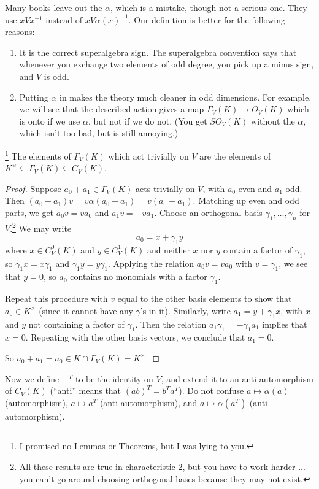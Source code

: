    Many books leave out the $\alpha$, which is a mistake, though not a serious one.
   They use $xVx^{-1}$ instead of $xV\alpha(x)^{-1}$.
   Our definition is better for the following reasons:
   \begin{enumerate}
   \item It is the correct superalgebra sign. The superalgebra convention
   says that whenever you exchange two elements of odd degree, you pick up a minus sign, and
   $V$ is odd.

   \item Putting $\alpha$ in makes the theory much cleaner in odd dimensions. For
   example, we will see that the described action gives a map $\Gamma_V(K)\to O_V(K)$
   which is onto if we use $\alpha$, but not if we do not. (You get $SO_V(K)$ without the
   $\alpha$, which isn't too bad, but is still annoying.)
   \end{enumerate}
 \begin{lemma}\label{lec23L} \hspace*{-1ex}\footnote{I promised no Lemmas or Theorems, but I was
   lying to you.} The elements of $\Gamma_V(K)$ which act trivially on
   $V$ are the elements of $K^\times \subseteq \Gamma_V(K)\subseteq C_V(K)$.
 \end{lemma}
 \begin{proof}
   Suppose $a_0+a_1\in \Gamma_V(K)$ acts trivially on $V$, with $a_0$ even and $a_1$ odd.
   Then $(a_0+a_1)v=v\alpha(a_0+a_1)=v(a_0-a_1)$. Matching up even and odd parts, we get
   $a_0v=va_0$ and $a_1 v=-va_1$. Choose an orthogonal basis $\gamma_1,\dots, \gamma_n$
   for $V$.\footnote{All these results are true in characteristic 2, but you have to work
   harder ... you can't go around choosing orthogonal bases because they may not exist.}
   We may write
   \[
      a_0 = x + \gamma_1 y
   \]
    where $x \in C_V^0(K)$ and $y \in C_V^1(K)$ and neither $x$ nor $y$ contain a factor
    of $\gamma_1$, so $\gamma_1 x=x\gamma_1$ and $\gamma_1y=y\gamma_1$. Applying the
    relation $a_0v = va_0$ with $v=\gamma_1$, we see that $y=0$, so $a_0$
    contains no monomials with a factor $\gamma_1$.

    Repeat this procedure with $v$ equal to the other basis elements to show that $a_0\in
    K^\times$ (since it cannot have any $\gamma$'s in it). Similarly, write
    $a_1=y+\gamma_1 x$, with $x$ and $y$ not containing a factor of $\gamma_1$. Then the
    relation $a_1 \gamma_1=-\gamma_1a_1$ implies that $x=0$. Repeating with the other
    basis vectors, we conclude that $a_1=0$.

    So $a_0 + a_1 = a_0 \in K \cap \Gamma_V(K) = K^\times$.
 \end{proof}
   Now we define ${-}^T$ to be the identity on $V$, and extend it to an anti-automorphism
   of $C_V(K)$ (``anti'' means that $(ab)^T=b^Ta^T$). Do not confuse $a\mapsto \alpha(a)$
   (automorphism), $a\mapsto a^T$ (anti-automorphism), and $a\mapsto \alpha(a^T)$
   (anti-automorphism).

